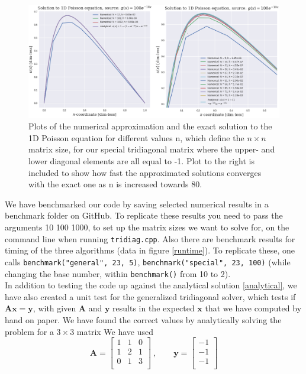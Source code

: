 \documentclass[12pt]{article}
\numberwithin{figure}{section}
\numberwithin{table}{section}
\begin{document}
\begin{figure}[ht]
\label{fig:result}
\centerline{\includegraphics[scale=0.47]{double_illustration.png}}
	\caption{Plots of the numerical approximation and the exact solution to the 1D Poisson equation for different values n, which define the $n \times n$ matrix size, for our special tridiagonal matrix where the upper- and lower diagonal elements are all equal to -1. Plot to the right is included to show how fast the approximated solutions converges with the exact one as n is increased towards 80. }
\end{figure}

\noindent We have benchmarked our code by saving selected numerical results in a benchmark folder on GitHub. To replicate these results you need to pass the arguments 10 100 1000, to set up the matrix sizes we want to solve for, on the command line when running \texttt{tridiag.cpp}. Also there are benchmark results for timing of the three algorithms (data in figure \ref{runtime}). To replicate these, one calls \texttt{benchmark("general", 23, 5)}, \texttt{benchmark("special", 23, 100)} (while changing the base number, within \texttt{benchmark()} from 10 to 2). \\

\noindent In addition to testing the code up against the analytical solution \eqref{analytical}, we have also created a unit test for the generalized tridiagonal solver, which tests if $\mathbf{A}\mathbf{x}=\mathbf{y}$, with given $\mathbf{A}$ and $\mathbf{y}$ results in the expected $\mathbf{x}$ that we have computed by hand on paper. We have found the correct values by analytically solving the problem for a $3 \times 3$ matrix We have used
\begin{equation}
    \mathbf{A} = \begin{bmatrix}
                           1 & 1 & 0 \\
                           1 & 2 & 1 \\
                           0 & 1 & 3 \\
                      \end{bmatrix}
                      \ , \qquad \mathbf{y}=\begin{bmatrix}
                           -1 \\
                           -1 \\
                           -1 \\
                      \end{bmatrix}
\end{equation}
\end{document}
